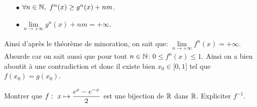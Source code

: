 \documentclass[a4paper, 11pt,reqno]{article}
\begin{document}
\begin{correction}
\begin{enumerate}
		      \begin{itemize}
			      \item[$\bullet$] $\forall n\in\mathbb{N},\ f^n(x)\geq g^n(x)+nm$.
			      \item[$\bullet$] $\lim\limits_{n\to +\infty} g^n(x)+nm=+\infty$.
		      \end{itemize}
		      Ainsi d'apr\`{e}s le th\'eor\`{e}me de minoration, on sait que: $\lim\limits_{n\to +\infty} f^n(x)=+\infty$. Absurde car on sait aussi que pour tout $n\in\mathbb{N}$: $0\leq f^n(x)\leq 1$. Ainsi on a bien aboutit \`{a} une contradiction et donc il existe bien $x_0\in\lbrack 0,1\rbrack$ tel que $f(x_0)=g(x_0)$.
	\end{enumerate}
\end{correction}
\begin{exercice}
Montrer que $f:\ x\mapsto \displaystyle\frac{e^x-e^{-x}}{2}$ est une bijection de $\mathbb{R}$ dans $\mathbb{R}$. Expliciter $f^{-1}$.
\end{exercice}
\end{document}
